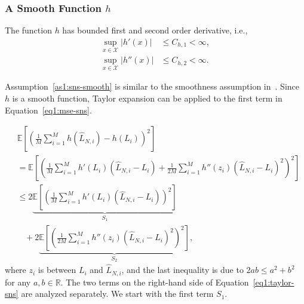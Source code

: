\subsubsection*{A Smooth Function $h$}
\begin{assumption}\label{as1:sns-smooth}
    The function $h$ has bounded first and second order derivative, i.e.,
    \begin{align*}
        \sup_{x \in \mathcal{X}} |h'(x)|  & \leq C_{h, 1} < \infty, \\
        \sup_{x \in \mathcal{X}} |h''(x)| & \leq C_{h, 2} < \infty.
    \end{align*}
\end{assumption}

Assumption~\ref{as1:sns-smooth} is similar to the smoothness assumption in~\cite{wang2022smooth}.
Since $h$ is a smooth function, Taylor expansion can be applied to the first term in Equation~\eqref{eq1:mse-sns}.

\begin{align}\label{eq1:taylor-sns}
    & \mathbb{E} \left[  \left( \frac{1}{M} \sum_{i=1}^M h\left( \hat{L}_{N, i} \right) -  h\left(L_i \right)  \right)^2\right] \nonumber \\
    & = \mathbb{E} \left[ \left( \frac{1}{M} \sum_{i=1}^M h'\left( L_i \right) \left( \hat{L}_{N, i} - L_i \right) +  \frac{1}{2M} \sum_{i=1}^M h''\left( z_i \right) \left( \hat{L}_{N, i} - L_i \right)^2 \right)^2\right] \nonumber \\
    & \leq 2 \underbrace{\mathbb{E} \left[ \left( \frac{1}{M} \sum_{i=1}^M h'\left( L_i \right) \left( \hat{L}_{N, i}- L_i \right) \right)^2\right]}_{S_1} \nonumber \\
    & ~~~~ + 2 \underbrace{\mathbb{E} \left[ \left( \frac{1}{2M} \sum_{i=1}^M h''\left( z_i \right) \left( \hat{L}_{N, i} - L_i \right)^2 \right)^2\right]}_{S_2},
\end{align}
where $z_i$ is between $L_i$ and $\hat{L}_{N,i}$, and the last inequality is due to $2ab \leq a^2 + b^2$ for any $a, b \in \mathbb{R}$. 
The two terms on the right-hand side of Equation~\eqref{eq1:taylor-sns} are analyzed separately.
We start with the first term $S_1$.

